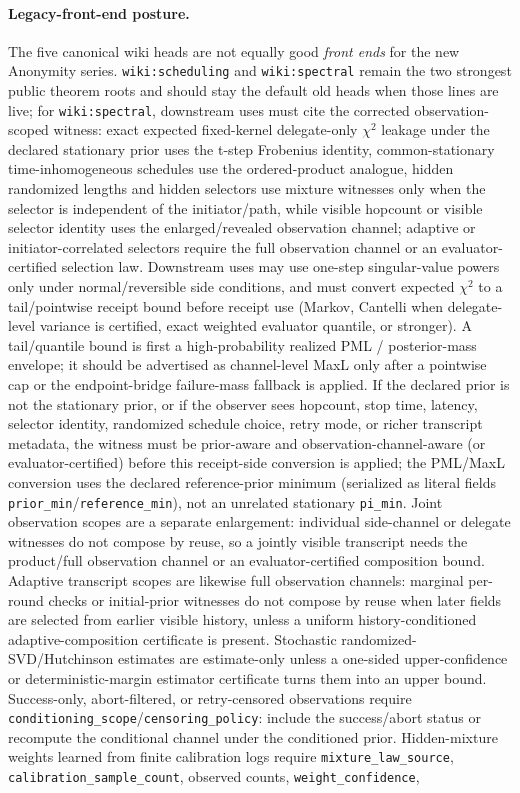 \documentclass[11pt]{article}
\begin{document}
\paragraph{Legacy-front-end posture.}
The five canonical wiki heads are not equally good \emph{front ends} for the new Anonymity series.
\texttt{wiki:scheduling} and \texttt{wiki:spectral} remain the two strongest public theorem roots and should stay the default old heads when those lines are live; for \texttt{wiki:spectral}, downstream uses must cite the corrected observation-scoped witness: exact expected fixed-kernel delegate-only $\chi^2$ leakage under the declared stationary prior uses the t-step Frobenius identity, common-stationary time-inhomogeneous schedules use the ordered-product analogue, hidden randomized lengths and hidden selectors use mixture witnesses only when the selector is independent of the initiator/path, while visible hopcount or visible selector identity uses the enlarged/revealed observation channel; adaptive or initiator-correlated selectors require the full observation channel or an evaluator-certified selection law. Downstream uses may use one-step singular-value powers only under normal/reversible side conditions, and must convert expected $\chi^2$ to a tail/pointwise receipt bound before receipt use (Markov, Cantelli when delegate-level variance is certified, exact weighted evaluator quantile, or stronger). A tail/quantile bound is first a high-probability realized PML / posterior-mass envelope; it should be advertised as channel-level MaxL only after a pointwise cap or the endpoint-bridge failure-mass fallback is applied. If the declared prior is not the stationary prior, or if the observer sees hopcount, stop time, latency, selector identity, randomized schedule choice, retry mode, or richer transcript metadata, the witness must be prior-aware and observation-channel-aware (or evaluator-certified) before this receipt-side conversion is applied; the PML/MaxL conversion uses the declared reference-prior minimum (serialized as literal fields \nolinkurl{prior_min}/\nolinkurl{reference_min}), not an unrelated stationary \texttt{pi\_min}. Joint observation scopes are a separate enlargement: individual side-channel or delegate witnesses do not compose by reuse, so a jointly visible transcript needs the product/full observation channel or an evaluator-certified composition bound. Adaptive transcript scopes are likewise full observation channels: marginal per-round checks or initial-prior witnesses do not compose by reuse when later fields are selected from earlier visible history, unless a uniform history-conditioned adaptive-composition certificate is present. Stochastic randomized-SVD/Hutchinson estimates are estimate-only unless a one-sided upper-confidence or deterministic-margin estimator certificate turns them into an upper bound. Success-only, abort-filtered, or retry-censored observations require \nolinkurl{conditioning_scope}/\nolinkurl{censoring_policy}: include the success/abort status or recompute the conditional channel under the conditioned prior. Hidden-mixture weights learned from finite calibration logs require \nolinkurl{mixture_law_source}, \nolinkurl{calibration_sample_count}, observed counts, \nolinkurl{weight_confidence}, 
\end{document}
